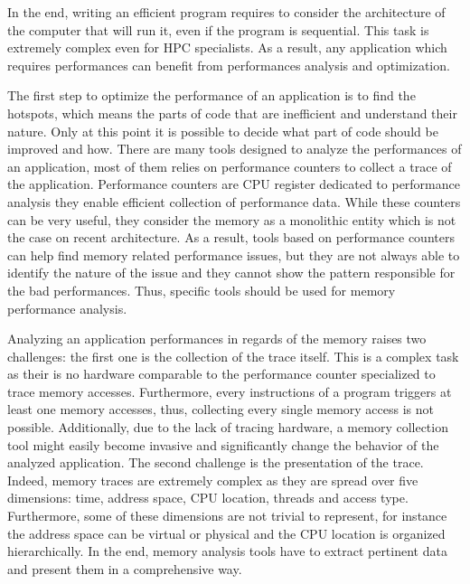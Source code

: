 In the end, writing an efficient program requires to consider the architecture of the computer that will run it, even if the program is sequential.
This task is extremely complex even for \gls{HPC} specialists.
As a result, any application which requires performances can benefit from performances analysis and optimization.

The first step to optimize the performance of an application is to find the hotspots, which means the parts of code that are inefficient and understand their nature.
Only at this point it is possible to decide what part of code should be improved and how.
There are many tools designed to analyze the performances of an application, most of them relies on performance counters to collect a trace of the application.
Performance counters are \gls{CPU} register dedicated to performance analysis they enable efficient collection of performance data.
While these counters can be very useful, they consider the memory as a monolithic entity which is not the case on recent architecture.
As a result, tools based on performance counters can help find memory related performance issues, but they are not always able to identify the nature of the issue and they cannot show the pattern responsible for the bad performances.
Thus, specific tools should be used for memory performance analysis.

Analyzing an application performances in regards of the memory raises two challenges: the first one is the collection of the trace itself.
This is a complex task as their is no hardware comparable to the performance counter specialized to trace memory accesses.
Furthermore, every instructions of a program triggers at least one memory accesses, thus, collecting every single memory access is not possible.
Additionally, due to the lack of tracing hardware, a memory collection tool might easily become invasive and significantly change the behavior of the analyzed application.
The second challenge is the presentation of the trace.
Indeed, memory traces are extremely complex as they are spread over five dimensions: time, address space, \gls{CPU} location, threads and access type.
Furthermore, some of these dimensions are not trivial to represent, for instance the address space can be virtual or physical and the \gls{CPU} location is organized hierarchically.
In the end, memory analysis tools have to extract pertinent data and present them in a comprehensive way.

